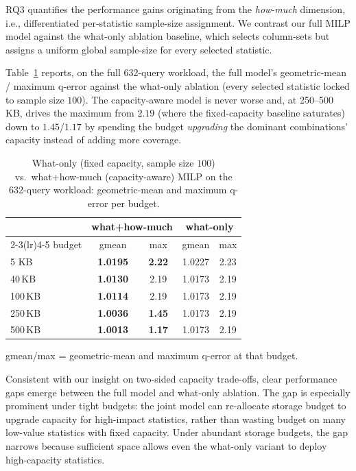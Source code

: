 \documentclass[sigconf, nonacm]{acmart}
\begin{document}
RQ3 quantifies the performance gains originating from the \textit{how-much} dimension, i.e., differentiated per-statistic sample-size assignment.
We contrast our full MILP model against the what-only ablation baseline, which selects column-sets but assigns a uniform global sample-size for every selected statistic.

Table~\ref{tab:whathowmuch} reports, on the full 632-query workload, the
full model's geometric-mean / maximum q-error against the what-only ablation
(every selected statistic locked to sample size $100$). The capacity-aware
model is never worse and, at 250--500\,KB, drives the maximum from $2.19$ (where
the fixed-capacity baseline saturates) down to $1.45$/$1.17$ by spending the
budget \emph{upgrading} the dominant combinations' capacity instead of adding
more coverage.

\begin{table}[t]
\caption{What-only (fixed capacity, sample size $100$) vs.\ what+how-much
(capacity-aware) MILP on the 632-query workload: geometric-mean and maximum
q-error per budget.}
\label{tab:whathowmuch}
\small
\begin{tabular}{lcc@{\hskip 6pt}cc}
\toprule
 & \multicolumn{2}{c}{what+how-much} & \multicolumn{2}{c}{what-only}\\
\cmidrule(lr){2-3}\cmidrule(lr){4-5}
budget & gmean & max & gmean & max\\
\midrule
5\,\,KB    & \textbf{1.0195} & \textbf{2.22} & 1.0227 & 2.23\\
40\,KB   & \textbf{1.0130} & 2.19 & 1.0173 & 2.19\\
100\,KB  & \textbf{1.0114} & 2.19 & 1.0173 & 2.19\\
250\,KB  & \textbf{1.0036} & \textbf{1.45} & 1.0173 & 2.19\\
500\,KB  & \textbf{1.0013} & \textbf{1.17} & 1.0173 & 2.19\\
\bottomrule
\end{tabular}

{\footnotesize gmean/max = geometric-mean and maximum q-error at that budget.}
\end{table}

Consistent with our insight on two-sided capacity trade-offs, clear performance gaps emerge between the full model and what-only ablation.
The gap is especially prominent under tight budgets: the joint model can re-allocate storage budget to upgrade capacity for high-impact statistics, rather than wasting budget on many low-value statistics with fixed capacity.
Under abundant storage budgets, the gap narrows because sufficient space allows even the what-only variant to deploy high-capacity statistics.
\end{document}
